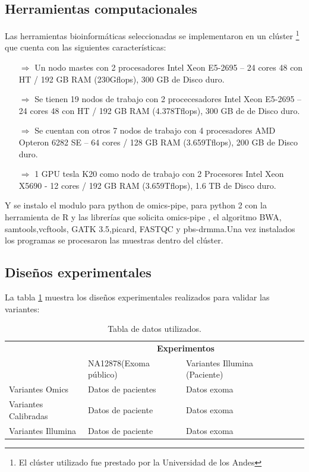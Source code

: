 {	\subsection*{Herramientas computacionales}
	
	Las herramientas bioinformáticas seleccionadas se implementaron en un clúster \footnote{El clúster utilizado fue prestado por la Universidad de los Andes} que cuenta con las siguientes características:
	
	\begin{itemize}
		\item[$\Rightarrow$] Un nodo mastes con 2 procesadores Intel Xeon E5-2695 – 24 cores 48 con HT / 192 GB RAM (230Gflops), 300 GB de Disco duro.
		\item[$\Rightarrow$] Se tienen 19 nodos de trabajo con 2 procecesadores  Intel Xeon E5-2695 – 24 cores 48 con HT / 192 GB RAM (4.378Tflops), 300 GB de de Disco duro.
		\item[$\Rightarrow$] Se cuentan con otros 7 nodos de trabajo con 4 procesadores AMD Opteron 6282 SE – 64 cores / 128 GB RAM (3.659Tflops), 200 GB de Disco duro.
		
		\item[$\Rightarrow$] 1 GPU tesla K20 como nodo de trabajo con 2 Procesores  Intel Xeon X5690 - 12 cores / 192 GB RAM (3.659Tflops), 1.6 TB de Disco duro.
		
	\end{itemize}
	
	Y se instalo el modulo para python de omics-pipe, para python 2 con la herramienta de R y las librerías que solicita omics-pipe\cite{Fisch2015} , el algoritmo BWA, samtools,vcftools, GATK 3.5,picard, FASTQC y pbs-drmma.Una vez instalados los programas se procesaron las muestras dentro del clúster.  

\subsection*{Diseños experimentales}

La tabla \ref{tabla:exp} muestra los diseños experimentales realizados para validar las variantes:

\begin{table}[htb]
	\begin{tabular}{|l|l|l|l|l|}
		\hline
		& \multicolumn{2}{c|}{\textbf{Experimentos}} \\
		\cline{2-3} 
		& NA12878(Exoma público)  & Variantes Illumina (Paciente)  \\ \cline{2-3}
		\hline 
		\multirow{1}{4cm}{Variantes Omics} & Datos de pacientes & Datos exoma   \\ \cline{2-3}
		\hline 
		\multirow{1}{4cm}{Variantes Calibradas} & Datos de paciente & Datos exoma    \\ \cline{2-3}
		\hline
		\multirow{1}{4cm}{Variantes Illumina} & Datos de paciente & Datos exoma     \\ \cline{2-3}
		\hline
	\end{tabular}
	\caption{Tabla de datos utilizados.}
	\label{tabla:exp}
\end{table}

}
